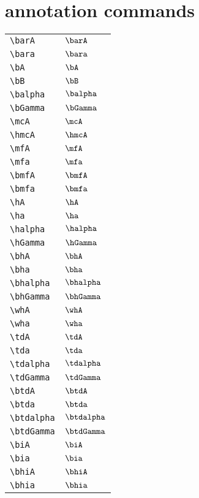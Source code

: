 \documentclass{article}
\begin{document}
\section{annotation commands}
\begin{tabular}{ll}
    \verb!\barA! & $\barA$ \\
    \verb!\bara! & $\bara$ \\
    \verb!\bA! & $\bA$ \\
    \verb!\bB! & $\bB$ \\
    \verb!\balpha! & $\balpha$ \\
    \verb!\bGamma! & $\bGamma$ \\
    \verb!\mcA! & $\mcA$ \\
    \verb!\hmcA! & $\hmcA$ \\
    \verb!\mfA! & $\mfA$ \\
    \verb!\mfa! & $\mfa$ \\
    \verb!\bmfA! & $\bmfA$ \\
    \verb!\bmfa! & $\bmfa$ \\
    \verb!\hA! & $\hA$ \\
    \verb!\ha! & $\ha$ \\
    \verb!\halpha! & $\halpha$ \\
    \verb!\hGamma! & $\hGamma$ \\
    \verb!\bhA! & $\bhA$ \\
    \verb!\bha! & $\bha$ \\
    \verb!\bhalpha! & $\bhalpha$ \\
    \verb!\bhGamma! & $\bhGamma$ \\
    \verb!\whA! & $\whA$ \\
    \verb!\wha! & $\wha$ \\
    \verb!\tdA! & $\tdA$ \\
    \verb!\tda! & $\tda$ \\
    \verb!\tdalpha! & $\tdalpha$ \\
    \verb!\tdGamma! & $\tdGamma$ \\
    \verb!\btdA! & $\btdA$ \\
    \verb!\btda! & $\btda$ \\
    \verb!\btdalpha! & $\btdalpha$ \\
    \verb!\btdGamma! & $\btdGamma$ \\
    \verb!\biA! & $\biA$ \\
    \verb!\bia! & $\bia$ \\
    \verb!\bhiA! & $\bhiA$ \\
    \verb!\bhia! & $\bhia$ \\
\end{tabular}
\end{document}
